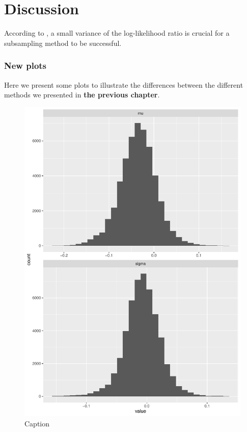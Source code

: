 \chapter{Discussion}
According to \cite{quiroz2019speeding}, a small variance of the log-likelihood ratio is crucial for a subsampling method to be successful.  

\subsection{New plots}
Here we present some plots to illustrate the differences between the different methods we presented in \textbf{the previous chapter}. 
\begin{figure}[H]
    \centering
    \includegraphics[scale = 0.7, page = 3]{figures/test.pdf}
    \caption{Caption}
    \label{fig:my_label}
\end{figure}{}

